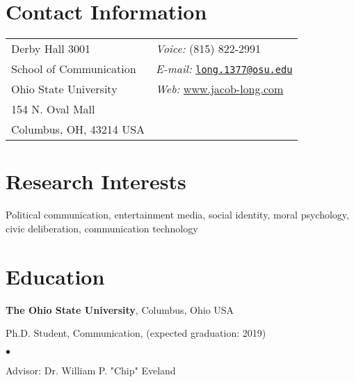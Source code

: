 \documentclass[margin,line]{res}
\newenvironment{list1}{
  \begin{list}{\ding{113}}{%
      \setlength{\itemsep}{0in}
      \setlength{\parsep}{0in} \setlength{\parskip}{0in}
      \setlength{\topsep}{0in} \setlength{\partopsep}{0in} 
      \setlength{\leftmargin}{0.17in}}}{\end{list}}
\newenvironment{list2}{
  \begin{list}{$\bullet$}{%
      \setlength{\itemsep}{0in}
      \setlength{\parsep}{0in} \setlength{\parskip}{0in}
      \setlength{\topsep}{0in} \setlength{\partopsep}{0in} 
      \setlength{\leftmargin}{0.2in}}}{\end{list}}
\begin{document}

\begin{resume}
\section{\sc Contact Information}
\vspace{.05in}
\begin{tabular}{@{}p{2in}p{4in}}
Derby Hall 3001           & {\it Voice:}  (815) 822-2991 \\            
School of Communication & {\it E-mail:}  \href{mailto:long.1377@osu.edu}{\nolinkurl{long.1377@osu.edu}}\\         
Ohio State University & {\it Web:} \url{www.jacob-long.com}\\ 
154 N. Oval Mall \\      
Columbus, OH, 43214 USA \\     
\end{tabular}


\section{\sc Research Interests}
Political communication, entertainment media, social identity, moral psychology,\\ civic deliberation, communication technology

\section{\sc Education}
{\bf The Ohio State University}, Columbus, Ohio USA\\
\vspace*{-.1in}
\begin{list1}
\item[] Ph.D. Student, Communication, (expected graduation: 2019)
\begin{list2}
\vspace*{.05in}
\item Advisor: Dr. William P. "Chip" Eveland
\end{list2}
\end{list1}


\end{resume}
\end{document}
